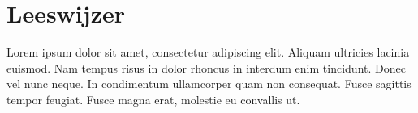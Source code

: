 \section{Leeswijzer}

Lorem ipsum dolor sit amet, consectetur adipiscing elit. Aliquam ultricies lacinia euismod. Nam tempus risus in dolor rhoncus in interdum enim tincidunt. Donec vel nunc neque. In condimentum ullamcorper quam non consequat. Fusce sagittis tempor feugiat. Fusce magna erat, molestie eu convallis ut.